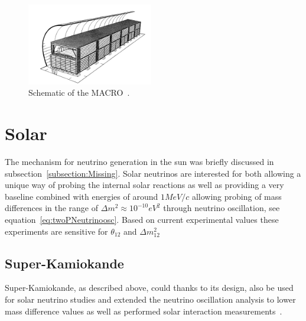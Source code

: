 \begin{figure}[h!]
\centering
  \centering
\includegraphics[width=0.49\textwidth]{figures/MACRO.jpeg}
\vspace{2mm}
\caption{Schematic of the MACRO~\cite{61MACRO}.}
\label{fig:macro}
\end{figure}

\pagebreak
\newpage
\section{Solar}
The mechanism for neutrino generation in the sun was briefly discussed in subsection~\ref{subsection:Missing}.
Solar neutrinos are interested for both allowing a unique way of probing the internal solar reactions as well as providing a very baseline combined with energies of around $1 MeV/c$ allowing probing of mass differences in the range of $\Delta m^2 \approx 10^{-10} eV^2$ through neutrino oscillation, see equation~\ref{eq:twoPNeutrinoosc}. Based on current experimental values these experiments are sensitive for $\theta_{12}$ and $\Delta m_{12}^2 $


\subsection{Super-Kamiokande}

Super-Kamiokande, as described above, could thanks to its design, also be used for solar neutrino studies and extended the neutrino oscillation analysis to lower mass difference values as well as performed solar interaction measurements~\cite{64SuperK}.

